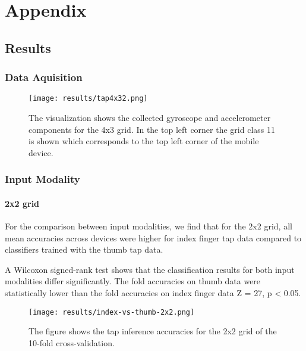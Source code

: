 \appendix

  \chapter{Appendix}
  
  \section*{Results}
  \subsection*{Data Aquisition}
  
  \begin{figure}[h!]
    \centering
    \texttt{[image: results/tap4x32.png]}
    \caption{The visualization shows the collected gyroscope and accelerometer components for the 4x3 grid. In the top left corner the grid class 11 is shown which corresponds to the top left corner of the mobile device.} \label{fig:taps}
  \end{figure}
  
  \subsection*{Input Modality}
  \subsubsection*{2x2 grid}
  For the comparison between input modalities, we find that for the 2x2 grid, all mean accuracies across devices were higher for index finger tap data compared to classifiers trained with the thumb tap data.
  
  A Wilcoxon signed-rank test shows that the classification results for both input modalities differ significantly. The fold accuracies on thumb data were statistically lower than the fold accuracies on index finger data Z = 27, p < 0.05.
  
  \begin{figure}[h!]
    \centering
    \texttt{[image: results/index-vs-thumb-2x2.png]}
    \caption{The figure shows the tap inference accuracies for the 2x2 grid of the 10-fold cross-validation.} \label{fig:participation}
  \end{figure}
  
